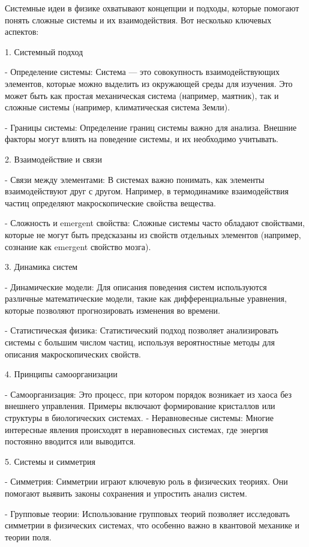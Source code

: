 \documentclass[exam_answers.tex]{subfiles}
\begin{document}
\renewcommand{\baselinestretch}{\blch}

Системные идеи в физике охватывают концепции и подходы, которые помогают понять сложные системы и их взаимодействия. Вот несколько ключевых аспектов:

1. Системный подход

- Определение системы: Система — это совокупность взаимодействующих элементов, которые можно выделить из окружающей среды для изучения. Это может быть как простая механическая система (например, маятник), так и сложные системы (например, климатическая система Земли).

- Границы системы: Определение границ системы важно для анализа. Внешние факторы могут влиять на поведение системы, и их необходимо учитывать.

2. Взаимодействие и связи

- Связи между элементами: В системах важно понимать, как элементы взаимодействуют друг с другом. Например, в термодинамике взаимодействия частиц определяют макроскопические свойства вещества.

- Сложность и emergent свойства: Сложные системы часто обладают свойствами, которые не могут быть предсказаны из свойств отдельных элементов (например, сознание как emergent свойство мозга).

3. Динамика систем

- Динамические модели: Для описания поведения систем используются различные математические модели, такие как дифференциальные уравнения, которые позволяют прогнозировать изменения во времени.

- Статистическая физика: Статистический подход позволяет анализировать системы с большим числом частиц, используя вероятностные методы для описания макроскопических свойств.

4. Принципы самоорганизации

- Самоорганизация: Это процесс, при котором порядок возникает из хаоса без внешнего управления. Примеры включают формирование кристаллов или структуры в биологических системах.
- Неравновесные системы: Многие интересные явления происходят в неравновесных системах, где энергия постоянно вводится или выводится.

5. Системы и симметрия

- Симметрия: Симметрии играют ключевую роль в физических теориях. Они помогают выявить законы сохранения и упростить анализ систем.

- Групповые теории: Использование групповых теорий позволяет исследовать симметрии в физических системах, что особенно важно в квантовой механике и теории поля.
\end{document}
